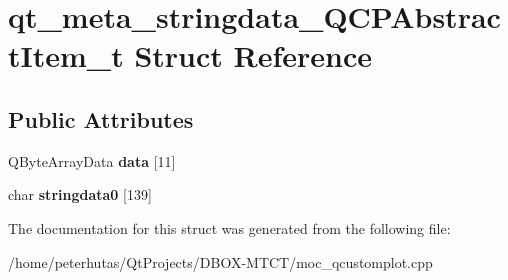\hypertarget{structqt__meta__stringdata___q_c_p_abstract_item__t}{}\section{qt\+\_\+meta\+\_\+stringdata\+\_\+\+Q\+C\+P\+Abstract\+Item\+\_\+t Struct Reference}
\label{structqt__meta__stringdata___q_c_p_abstract_item__t}
\subsection*{Public Attributes}
\begin{DoxyCompactItemize}
\item 
\mbox{\label{structqt__meta__stringdata___q_c_p_abstract_item__t_a9e33f2a80b5df62d63aafd9326b07a92}} 
Q\+Byte\+Array\+Data {\bfseries data} \mbox{[}11\mbox{]}
\item 
\mbox{\label{structqt__meta__stringdata___q_c_p_abstract_item__t_a4a1f8f9acd2583f039a05de696c20ba6}} 
char {\bfseries stringdata0} \mbox{[}139\mbox{]}
\end{DoxyCompactItemize}


The documentation for this struct was generated from the following file\+:\begin{DoxyCompactItemize}
\item 
/home/peterhutas/\+Qt\+Projects/\+D\+B\+O\+X-\/\+M\+T\+C\+T/moc\+\_\+qcustomplot.\+cpp\end{DoxyCompactItemize}
